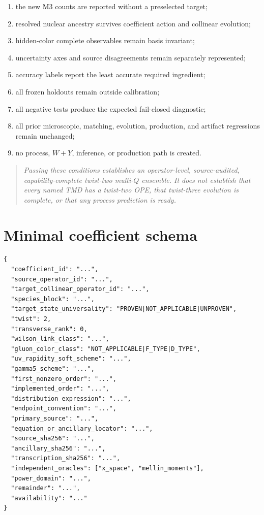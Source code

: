 \documentclass[11pt]{article}
\begin{document}
\begin{enumerate}
\item the new M3 counts are reported without a preselected target;
\item resolved nuclear ancestry survives coefficient action and collinear evolution;
\item hidden-color complete observables remain basis invariant;
\item uncertainty axes and source disagreements remain separately represented;
\item accuracy labels report the least accurate required ingredient;
\item all frozen holdouts remain outside calibration;
\item all negative tests produce the expected fail-closed diagnostic;
\item all prior microscopic, matching, evolution, production, and artifact regressions remain unchanged;
\item no process, \(W+Y\), inference, or production path is created.
\end{enumerate}

\begin{quote}
\emph{Passing these conditions establishes an operator-level, source-audited, capability-complete twist-two multi-\(Q\) ensemble.  It does not establish that every named TMD has a twist-two OPE, that twist-three evolution is complete, or that any process prediction is ready.}
\end{quote}

\appendix

\section{Minimal coefficient schema}
\label{app:coefficient-schema}

\begin{verbatim}
{
  "coefficient_id": "...",
  "source_operator_id": "...",
  "target_collinear_operator_id": "...",
  "species_block": "...",
  "target_state_universality": "PROVEN|NOT_APPLICABLE|UNPROVEN",
  "twist": 2,
  "transverse_rank": 0,
  "wilson_link_class": "...",
  "gluon_color_class": "NOT_APPLICABLE|F_TYPE|D_TYPE",
  "uv_rapidity_soft_scheme": "...",
  "gamma5_scheme": "...",
  "first_nonzero_order": "...",
  "implemented_order": "...",
  "distribution_expression": "...",
  "endpoint_convention": "...",
  "primary_source": "...",
  "equation_or_ancillary_locator": "...",
  "source_sha256": "...",
  "ancillary_sha256": "...",
  "transcription_sha256": "...",
  "independent_oracles": ["x_space", "mellin_moments"],
  "power_domain": "...",
  "remainder": "...",
  "availability": "..."
}
\end{verbatim}
\end{document}

